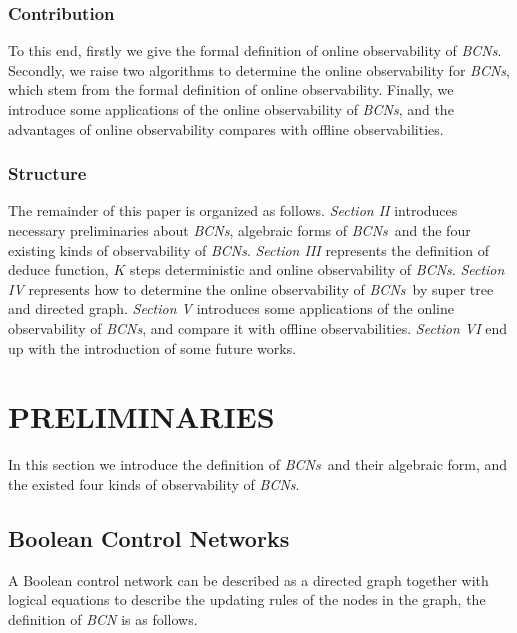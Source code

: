 \documentclass[conference]{IEEEtran} %
\def \BCNs {{\em BCNs}}
\newcommand{\rev}[1]{{\color{red}{#1}}}
\newcommand{\tl}[1]{\textcolor{blue} {TL: #1 :TL} }
\begin{document}
\subsubsection*{Contribution}
To this end, firstly we give the formal definition of online observability of {\em BCNs}. Secondly, we raise two algorithms to determine the online observability for {\em BCNs}, which stem from the formal definition of online observability. Finally, we introduce some applications of the online observability of {\em BCNs}, and the advantages of online observability compares with offline observabilities. %
\subsubsection*{Structure}
The remainder of this paper is organized as follows. {\em Section II} introduces necessary preliminaries about {\em BCNs}, algebraic forms of \BCNs\ and the four existing kinds of observability of {\em BCNs}. {\em Section III} represents the definition of deduce function, $K$ steps deterministic and online observability of {\em BCNs}. {\em Section IV} represents how to determine the online observability of \BCNs\ by super tree and directed graph. {\em Section V} introduces some applications of the online observability of {\em BCNs}, and compare it with offline observabilities. {\em Section VI} end up  with the introduction of some future works.


\section{PRELIMINARIES}
In this section we introduce the definition of \BCNs\ and their algebraic form, and the existed four kinds of observability of {\em BCNs}.



\subsection{Boolean Control Networks}

A Boolean control network can be described as a directed graph together with logical equations to describe the updating rules of the nodes in the graph, the definition of {\em BCN} is as follows. 
\end{document}
